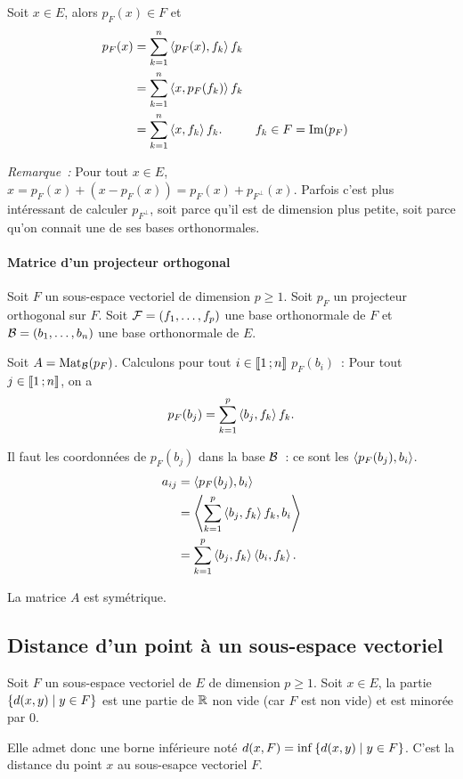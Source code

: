 Soit $x \in E$, alors $p_F(x) \in F$ et
\begin{align}
  p_F(x) &=\sum_{k=1}^n \left\langle{p_F(x)},{f_k}\right\rangle f_k \\
  &=\sum_{k=1}^n \left\langle{x},{p_F(f_k)}\right\rangle f_k \\
  &=\sum_{k=1}^n \left\langle{x},{f_k}\right\rangle f_k. && f_k \in F=\operatorname{Im}(p_F)
\end{align}

\emph{Remarque~:} Pour tout $x \in E$, $x = p_F(x) +(x-p_F(x)) = p_F(x) + p_{F^\perp}(x)$. Parfois c'est plus intéressant de calculer $p_{F^\perp}$, soit parce qu'il est de dimension plus petite, soit parce qu'on connait une de ses bases orthonormales.

\paragraph{Matrice d'un projecteur orthogonal}
Soit $F$ un sous-espace vectoriel de dimension $p \geqslant 1$. Soit $p_F$ un projecteur orthogonal sur $F$. Soit $\mathcal{F}=(f_1, \ldots, f_p)$ une base orthonormale de $F$ et $\mathcal{B}=(b_1, \ldots, b_n)$ une base orthonormale de $E$.

Soit $A=\mathrm{Mat}_{\mathcal{B}}(p_F)$. Calculons pour tout $i \in \mathopen{\llbracket}1\mathclose{}\mathpunct{};n\mathclose{\rrbracket}$ $p_F(b_i)$~: Pour tout $j \in \mathopen{\llbracket}1\mathclose{}\mathpunct{};n\mathclose{\rrbracket}$, on a
\begin{equation}
  p_F(b_j)=\sum_{k=1}^p \left\langle{b_j},{f_k}\right\rangle f_k.
\end{equation}

Il faut les coordonnées de $p_F(b_j)$ dans la base $\mathcal{B}$~: ce sont les $\left\langle{p_F(b_j)},{b_i}\right\rangle$.
\begin{align}
  a_{ij} &= \left\langle{p_F(b_j)},{b_i}\right\rangle \\
  &= \left\langle{\sum_{k=1}^p \left\langle{b_j},{f_k}\right\rangle f_k},{b_i}\right\rangle \\
  &= \sum_{k=1}^p \left\langle{b_j},{f_k}\right\rangle \left\langle{b_i},{f_k}\right\rangle.
\end{align}

La matrice $A$ est symétrique.

\subsection{Distance d'un point à un sous-espace vectoriel}

Soit $F$ un sous-espace vectoriel de $E$ de dimension $p \geqslant 1$. Soit $x \in E$, la partie $\left\{d(x,y)\mathrel{}\middle|\mathrel{}y \in F\right\}$ est une partie de $\mathbb{R}$ non vide (car $F$ est non vide) et est minorée par $0$.

Elle admet donc une borne inférieure noté $d(x,F)=\inf\left\{d(x,y)\mathrel{}\middle|\mathrel{}y \in F\right\}$. C'est la distance du point $x$ au sous-esapce vectoriel $F$.

